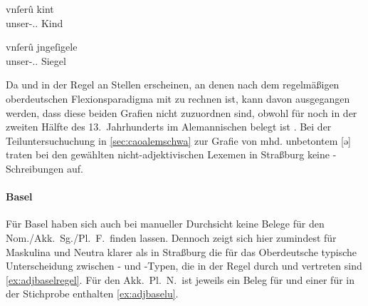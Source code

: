 \begin{exe}
\ex \label{ex:adjstrbgu}
	\begin{xlist}

	\ex \label{ex:adjstrbgu_3}
		\gll vnſerû kint \\
			unser-\Acc.\Pl.\NeutX{} Kind \\
		\begin{taggedline}{\parencites(Straßburg, 1297)[\pno~2663, 62.35]{cao4}}
		\trans {}
		\end{taggedline}

	\ex \label{ex:adjstrbgu_4}
		\gll vnſerû jngeſigele \\
			unser-\Acc.\Pl.\NeutI{} Siegel \\
		\begin{taggedline}{\parencites(Straßburg, 1297)[\pno~2663, 63.25]{cao4}}
		\trans {}
		\end{taggedline}
	\end{xlist}
\end{exe}

Da  und  in der Regel an Stellen erscheinen, an denen nach dem
regelmäßigen oberdeutschen Flexionsparadigma mit  zu rechnen ist,
kann davon ausgegangen werden, dass diese beiden Grafien nicht 
zuzuordnen sind, obwohl  für  noch in der zweiten Hälfte des
13.~Jahrhunderts im Alemannischen belegt ist
\autocites[41]{paul2007}[305]{ksw2}[vgl.~auch][466--467]{schirmunski1962}. Bei
der Teiluntersuchuchung in \cref{sec:caoalemschwa} zur Grafie von mhd.
unbetontem  [ə] traten bei den gewählten nicht-adjektivischen Lexemen
in Straßburg keine -Schreibungen auf.

\paragraph{Basel}
\label{par:adjbasel}
Für Basel haben sich auch bei manueller Durchsicht keine Belege für den
Nom./Akk.\ Sg./Pl.\ F.\ finden lassen. Dennoch zeigt sich hier zumindest für
Maskulina und Neutra klarer als in Straßburg die für das Oberdeutsche typische
Unterscheidung zwischen - und -Typen, die in der Regel durch
 und  vertreten sind \cref{ex:adjbaselregel}. Für den Akk.\
Pl.\ N.\ ist jeweils ein Beleg für  und einer für  in der
Stichprobe enthalten \cref{ex:adjbaselu}.

